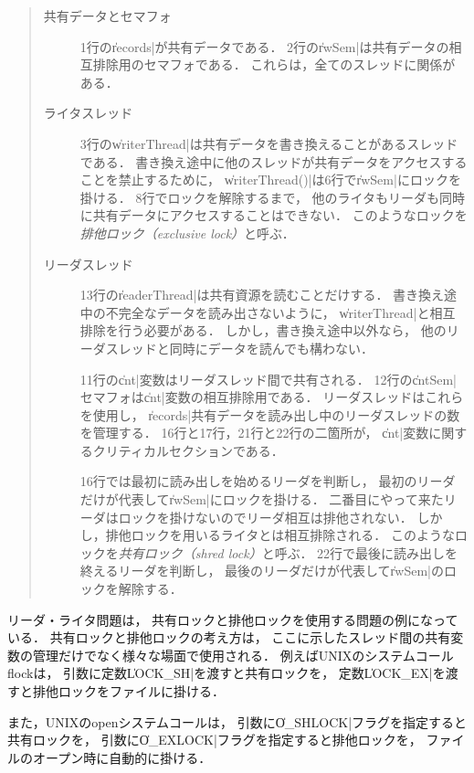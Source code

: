\begin{quote}
  \begin{description}
  \item [共有データとセマフォ]
    1行の\|records|が共有データである．
    2行の\|rwSem|は共有データの相互排除用のセマフォである．
    これらは，全てのスレッドに関係がある．

  \item [ライタスレッド]
    3行の\|writerThread|は共有データを書き換えることがあるスレッドである．
    書き換え途中に他のスレッドが共有データをアクセスすることを禁止するために，
    \|writerThread()|は6行で\|rwSem|にロックを掛ける．
    8行でロックを解除するまで，
    他のライタもリーダも同時に共有データにアクセスすることはできない．
    このようなロックを\emph{排他ロック（exclusive lock）}と呼ぶ．

  \item [リーダスレッド]
    13行の\|readerThread|は共有資源を読むことだけする．
    書き換え途中の不完全なデータを読み出さないように，
    \|writerThread|と相互排除を行う必要がある．
    しかし，書き換え途中以外なら，
    他のリーダスレッドと同時にデータを読んでも構わない．

    11行の\|cnt|変数はリーダスレッド間で共有される．
    12行の\|cntSem|セマフォは\|cnt|変数の相互排除用である．
    リーダスレッドはこれらを使用し，
    \|records|共有データを読み出し中のリーダスレッドの数を管理する．
    16行と17行，21行と22行の二箇所が，
    \|cnt|変数に関するクリティカルセクションである．

    16行では最初に読み出しを始めるリーダを判断し，
    最初のリーダだけが代表して\|rwSem|にロックを掛ける．
    二番目にやって来たリーダはロックを掛けないのでリーダ相互は排他されない．
    しかし，排他ロックを用いるライタとは相互排除される．
    このようなロックを\emph{共有ロック（shred lock）}と呼ぶ．
    22行で最後に読み出しを終えるリーダを判断し，
    最後のリーダだけが代表して\|rwSem|のロックを解除する．
  \end{description}
\end{quote}

リーダ・ライタ問題は，
共有ロックと排他ロックを使用する問題の例になっている．
共有ロックと排他ロックの考え方は，
ここに示したスレッド間の共有変数の管理だけでなく様々な場面で使用される．
例えばUNIXのシステムコールflockは，
引数に定数\|LOCK_SH|を渡すと共有ロックを，
定数\|LOCK_EX|を渡すと排他ロックをファイルに掛ける．

また，UNIXのopenシステムコールは，
引数に\|O_SHLOCK|フラグを指定すると共有ロックを，
引数に\|O_EXLOCK|フラグを指定すると排他ロックを，
ファイルのオープン時に自動的に掛ける．

